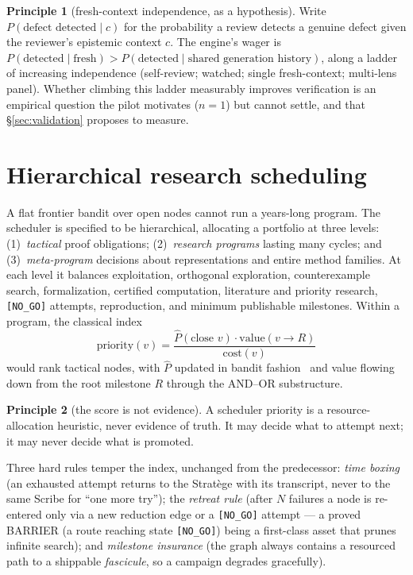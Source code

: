 \documentclass[11pt]{amsart}
\theoremstyle{definition}
\newtheorem{principle}{Principle}
\theoremstyle{remark}
\newcommand{\state}[1]{\texttt{[#1]}}
\newcommand{\otype}[1]{\textsc{#1}}
\begin{document}
\begin{principle}[fresh-context independence, as a hypothesis]\label{pr:fresh}
Write $P(\text{defect detected}\mid c)$ for the probability a review detects a
genuine defect given the reviewer's epistemic context $c$. The engine's wager is
$P(\text{detected}\mid\text{fresh}) > P(\text{detected}\mid\text{shared
generation history})$, along a ladder of increasing independence (self-review;
watched; single fresh-context; multi-lens panel). Whether climbing this ladder
measurably improves verification is an empirical question the pilot motivates
($n=1$) but cannot settle, and that \S\ref{sec:validation} proposes to measure.
\end{principle}

\section{Hierarchical research scheduling}\label{sec:scheduler}

A flat frontier bandit over open nodes cannot run a years-long program. The
scheduler is specified to be hierarchical, allocating a portfolio at three levels:
(1)~\emph{tactical} proof obligations; (2)~\emph{research programs} lasting many
cycles; and (3)~\emph{meta-program} decisions about representations and entire
method families. At each level it balances exploitation, orthogonal exploration,
counterexample search, formalization, certified computation, literature and
priority research, \state{NO\_GO} attempts, reproduction, and minimum publishable
milestones. Within a program, the classical index
\[
\text{priority}(v)=\frac{\widehat{P}(\text{close }v)\cdot\text{value}(v\to R)}
{\text{cost}(v)}
\]
would rank tactical nodes, with $\widehat{P}$ updated in bandit
fashion~\cite{Auer02,Browne12} and value flowing down from the root milestone
$R$ through the AND--OR substructure.

\begin{principle}[the score is not evidence]\label{pr:score}
A scheduler priority is a resource-allocation heuristic, never evidence of truth.
It may decide what to attempt next; it may never decide what is promoted.
\end{principle}

Three hard rules temper the index, unchanged from the predecessor: \emph{time
boxing} (an exhausted attempt returns to the Strat\`ege with its transcript,
never to the same Scribe for ``one more try''); the \emph{retreat rule} (after
$N$ failures a node is re-entered only via a new reduction edge or a
\state{NO\_GO} attempt --- a proved \otype{BARRIER} (a route reaching state
\state{NO\_GO}) being a first-class asset that prunes infinite search); and
\emph{milestone insurance} (the graph always contains a resourced path to a
shippable \emph{fascicule}, so a campaign degrades gracefully).
\end{document}
